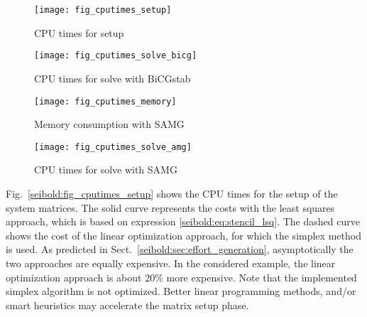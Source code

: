 \documentclass[reqno]{amsart}
\theoremstyle{plain}
\theoremstyle{definition}
\theoremstyle{remark}
\begin{document}
\begin{figure}
\centering
\begin{minipage}[t]{.49\textwidth}
\centering
\texttt{[image: fig\_cputimes\_setup]}
\vspace{-.5em}
\caption{CPU times for setup}
\label{seibold:fig_cputimes_setup}
\end{minipage}
\hfill
\begin{minipage}[t]{.49\textwidth}
\centering
\texttt{[image: fig\_cputimes\_solve\_bicg]}
\vspace{-.5em}
\caption{CPU times for solve with BiCGstab}
\label{seibold:fig_cputimes_solve_bicg}
\end{minipage}

\vspace{1em}

\begin{minipage}[t]{.49\textwidth}
\centering
\texttt{[image: fig\_cputimes\_memory]}
\vspace{-.5em}
\caption{Memory consumption with SAMG}
\label{seibold:fig_cputimes_memory}
\end{minipage}
\hfill
\begin{minipage}[t]{.49\textwidth}
\centering
\texttt{[image: fig\_cputimes\_solve\_amg]}
\vspace{-.5em}
\caption{CPU times for solve with SAMG}
\label{seibold:fig_cputimes_solve_amg}
\end{minipage}
\end{figure}

Fig.~\ref{seibold:fig_cputimes_setup} shows the CPU times for the setup of the system
matrices. The solid curve represents the costs with the least squares approach,
which is based on expression  \eqref{seibold:eq:stencil_lsq}. The dashed curve shows
the cost of the linear optimization approach, for which the simplex method is used.
As predicted in Sect.~\ref{seibold:sec:effort_generation}, asymptotically the two approaches
are equally expensive. In the considered example, the linear optimization approach
is about 20\% more expensive. Note that the implemented simplex algorithm is not
optimized. Better linear programming methods, and/or smart heuristics
may accelerate the matrix setup phase.
\end{document}
